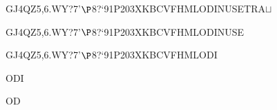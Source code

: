 \documentclass[12pt]{article}
\begin{document}
\begin{tt}
\begin{small}
\begin{bundle}{}
{\begin{bundle}{GJ4QZ5,6.WY?7'$\P$8?`91P203XKBCVFHMLODINUSETRA$\sqcup$}
{\begin{bundle}{GJ4QZ5,6.WY?7'$\P$8?`91P203XKBCVFHMLODINUSE}
{\begin{bundle}{GJ4QZ5,6.WY?7'$\P$8?`91P203XKBCVFHMLODI}
{\begin{bundle}{ODI}
{\begin{bundle}{OD}
\end{bundle}}
\end{bundle}}
\end{bundle}}
\end{bundle}}
\end{bundle}}
\end{bundle}
\end{small}
\end{tt}
\newpage%
\end{document}
